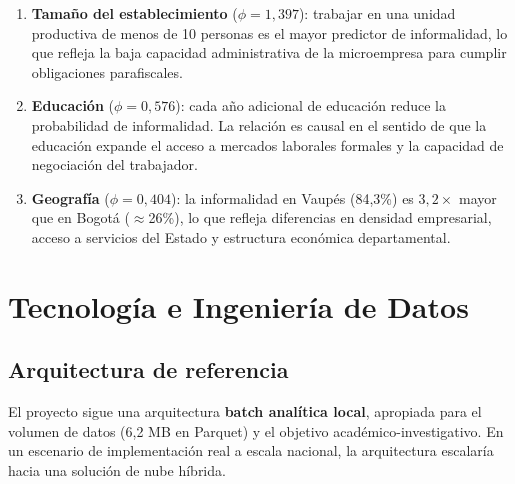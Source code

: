 \documentclass[12pt, a4paper]{article}
\begin{document}
\begin{enumerate}[label=\arabic*.]
  \item \textbf{Tamaño del establecimiento} ($\phi = 1{,}397$): trabajar en una unidad
  productiva de menos de 10 personas es el mayor predictor de informalidad, lo que
  refleja la baja capacidad administrativa de la microempresa para cumplir obligaciones
  parafiscales.
  \item \textbf{Educación} ($\phi = 0{,}576$): cada año adicional de educación reduce
  la probabilidad de informalidad. La relación es causal en el sentido de que la educación
  expande el acceso a mercados laborales formales y la capacidad de negociación del trabajador.
  \item \textbf{Geografía} ($\phi = 0{,}404$): la informalidad en Vaupés (84{,}3\%) es
  $3{,}2\times$ mayor que en Bogotá ($\approx$26\%), lo que refleja diferencias en densidad
  empresarial, acceso a servicios del Estado y estructura económica departamental.
\end{enumerate}

\section{Tecnología e Ingeniería de Datos}
\label{sec:tecnologia}

\subsection{Arquitectura de referencia}

El proyecto sigue una arquitectura \textbf{batch analítica local}, apropiada para el
volumen de datos (6{,}2 MB en Parquet) y el objetivo académico-investigativo.
En un escenario de implementación real a escala nacional, la arquitectura escalaría
hacia una solución de nube híbrida.
\end{document}
